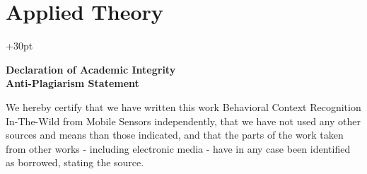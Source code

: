 \documentclass[a4paper,12pt]{scrartcl}
\begin{document}
\newpage
\setcounter{page}{1}









\section{Applied Theory}




























\newpage

\printbibliography
\hangindent+30pt 


\newpage
{}
\vspace*{1cm}
\begin{center}
	\Large \textbf{Declaration of Academic Integrity}\\
	
	\large \textbf{Anti-Plagiarism Statement}
\end{center}

\normalsize
\vspace{25mm}
We hereby certify that we have written this work \grqq Behavioral Context Recognition In-The-Wild from Mobile Sensors\grqq{} independently, that we have not used any other sources and means than those indicated, and that the parts of the work taken from other works - including electronic media - have in any case been identified as borrowed, stating the source.\\
	
	
	
\end{document}
